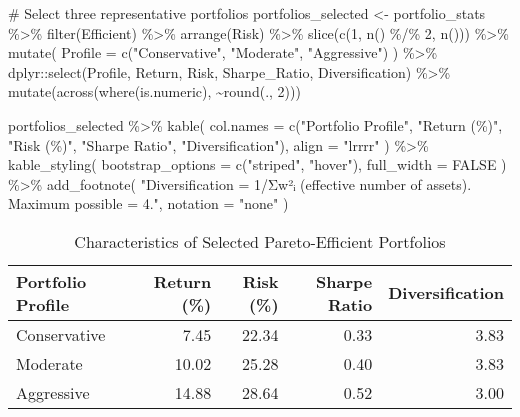 \documentclass[
  10pt,
  a4paper,
]{article}
\newenvironment{Shaded}{\begin{snugshade}}{\end{snugshade}}
\newcommand{\AttributeTok}[1]{\textcolor[rgb]{0.40,0.45,0.13}{#1}}
\newcommand{\CommentTok}[1]{\textcolor[rgb]{0.37,0.37,0.37}{#1}}
\newcommand{\ConstantTok}[1]{\textcolor[rgb]{0.56,0.35,0.01}{#1}}
\newcommand{\DecValTok}[1]{\textcolor[rgb]{0.68,0.00,0.00}{#1}}
\newcommand{\FunctionTok}[1]{\textcolor[rgb]{0.28,0.35,0.67}{#1}}
\newcommand{\NormalTok}[1]{\textcolor[rgb]{0.00,0.23,0.31}{#1}}
\newcommand{\OtherTok}[1]{\textcolor[rgb]{0.00,0.23,0.31}{#1}}
\newcommand{\SpecialCharTok}[1]{\textcolor[rgb]{0.37,0.37,0.37}{#1}}
\newcommand{\StringTok}[1]{\textcolor[rgb]{0.13,0.47,0.30}{#1}}
\begin{document}
\begin{Shaded}
\begin{Highlighting}[]
\CommentTok{\# Select three representative portfolios}
\NormalTok{portfolios\_selected }\OtherTok{\textless{}{-}}\NormalTok{ portfolio\_stats }\SpecialCharTok{\%\textgreater{}\%}
  \FunctionTok{filter}\NormalTok{(Efficient) }\SpecialCharTok{\%\textgreater{}\%}
  \FunctionTok{arrange}\NormalTok{(Risk) }\SpecialCharTok{\%\textgreater{}\%}
  \FunctionTok{slice}\NormalTok{(}\FunctionTok{c}\NormalTok{(}\DecValTok{1}\NormalTok{, }\FunctionTok{n}\NormalTok{() }\SpecialCharTok{\%/\%} \DecValTok{2}\NormalTok{, }\FunctionTok{n}\NormalTok{())) }\SpecialCharTok{\%\textgreater{}\%}
  \FunctionTok{mutate}\NormalTok{(}
    \AttributeTok{Profile =} \FunctionTok{c}\NormalTok{(}\StringTok{"Conservative"}\NormalTok{, }\StringTok{"Moderate"}\NormalTok{, }\StringTok{"Aggressive"}\NormalTok{)}
\NormalTok{  ) }\SpecialCharTok{\%\textgreater{}\%}
\NormalTok{  dplyr}\SpecialCharTok{::}\FunctionTok{select}\NormalTok{(Profile, Return, Risk, Sharpe\_Ratio, Diversification) }\SpecialCharTok{\%\textgreater{}\%}
  \FunctionTok{mutate}\NormalTok{(}\FunctionTok{across}\NormalTok{(}\FunctionTok{where}\NormalTok{(is.numeric), }\SpecialCharTok{\textasciitilde{}}\FunctionTok{round}\NormalTok{(., }\DecValTok{2}\NormalTok{)))}

\NormalTok{portfolios\_selected }\SpecialCharTok{\%\textgreater{}\%}
  \FunctionTok{kable}\NormalTok{(}
    \AttributeTok{col.names =} \FunctionTok{c}\NormalTok{(}\StringTok{"Portfolio Profile"}\NormalTok{, }\StringTok{"Return (\%)"}\NormalTok{, }\StringTok{"Risk (\%)"}\NormalTok{, }
                  \StringTok{"Sharpe Ratio"}\NormalTok{, }\StringTok{"Diversification"}\NormalTok{),}
    \AttributeTok{align =} \StringTok{"lrrrr"}
\NormalTok{  ) }\SpecialCharTok{\%\textgreater{}\%}
  \FunctionTok{kable\_styling}\NormalTok{(}
    \AttributeTok{bootstrap\_options =} \FunctionTok{c}\NormalTok{(}\StringTok{"striped"}\NormalTok{, }\StringTok{"hover"}\NormalTok{),}
    \AttributeTok{full\_width =} \ConstantTok{FALSE}
\NormalTok{  ) }\SpecialCharTok{\%\textgreater{}\%}
  \FunctionTok{add\_footnote}\NormalTok{(}
    \StringTok{"Diversification = 1/Σw²ᵢ (effective number of assets). Maximum possible = 4."}\NormalTok{,}
    \AttributeTok{notation =} \StringTok{"none"}
\NormalTok{  )}
\end{Highlighting}
\end{Shaded}

\begin{longtable}[t]{lrrrr}

\caption{\label{tbl-portfolio-comparison}Characteristics of Selected
Pareto-Efficient Portfolios}

\tabularnewline

\toprule
Portfolio Profile & Return (\%) & Risk (\%) & Sharpe Ratio & Diversification\\
\midrule
Conservative & 7.45 & 22.34 & 0.33 & 3.83\\
Moderate & 10.02 & 25.28 & 0.40 & 3.83\\
Aggressive & 14.88 & 28.64 & 0.52 & 3.00\\
\bottomrule

\end{longtable}
\end{document}
